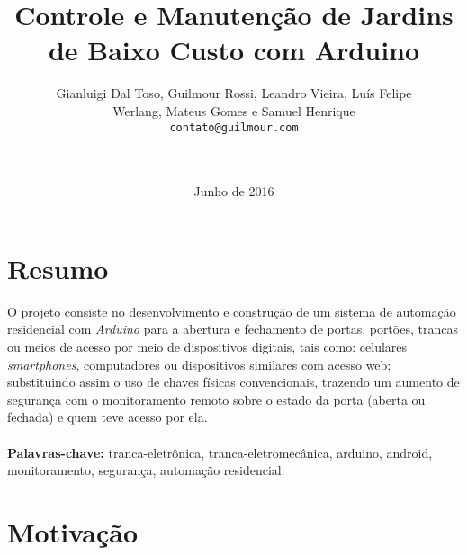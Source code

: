 \documentclass[a4paper,12pt]{article}
\begin{document}
\title{Controle e Manutenção de Jardins de Baixo Custo com Arduino}
\author{Gianluigi Dal Toso, Guilmour Rossi, Leandro Vieira, Luís Felipe\\Werlang, Mateus Gomes e Samuel Henrique\\\texttt{contato@guilmour.com}\\\\\\
}

\date{Junho de 2016}

\maketitle




\newpage


\tableofcontents


\newpage


\section{Resumo}
  O projeto consiste no desenvolvimento e construção de um sistema de automação residencial com \textit{Arduino} para a abertura e fechamento de portas, portões, trancas ou meios de acesso por meio de dispositivos digitais, tais como: celulares \textit{smartphones}, computadores ou dispositivos similares com acesso web; substituindo assim o uso de chaves físicas convencionais, trazendo um aumento de segurança com o monitoramento remoto sobre o estado da porta (aberta ou fechada) e quem teve acesso por ela.
  \textbf{\\\\Palavras-chave:} tranca-eletrônica, tranca-eletromecânica, arduino, android, monitoramento, segurança, automação residencial.


\newpage

\section{Motivação}
\end{document}
